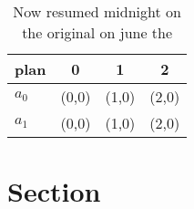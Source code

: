 \documentclass[a4paper]{article}
\begin{document}
\begin{table}
\begin{adjustbox}{width=0.6\columnwidth}
\begin{tabular}{|l|l|l|l|}
\hline
\textbf{plan} & \multicolumn{1}{c|}{\textbf{0}} & \multicolumn{1}{c|}{\textbf{1}} & \multicolumn{1}{c|}{\textbf{2}} \\ \hline
\textbf{$a_0$}  & (0,0) & (1,0) & (2,0) \\ \hline
\textbf{$a_1$}  & (0,0) & (1,0) & (2,0) \\ \hline
\end{tabular}
\end{adjustbox}
\caption{Now resumed midnight on the original on june the 
}
\end{table}

\section{Section}
\end{document}
